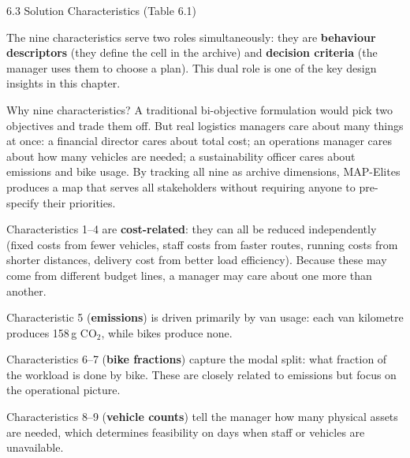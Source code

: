 \documentclass[aspectratio=169,10pt]{beamer}
\begin{document}
\begin{frame}[allowframebreaks]{6.3 Solution Characteristics (Table 6.1)}

The nine characteristics serve two roles simultaneously: they are
\textbf{behaviour descriptors} (they define the cell in the archive)
and \textbf{decision criteria} (the manager uses them to choose a plan).
This dual role is one of the key design insights in this chapter.

\medskip
\begin{block}{Why nine characteristics?}
A traditional bi-objective formulation would pick two objectives and
trade them off.
But real logistics managers care about many things at once:
a financial director cares about total cost; an operations manager
cares about how many vehicles are needed; a sustainability officer
cares about emissions and bike usage.
By tracking all nine as archive dimensions, MAP-Elites produces a map
that serves all stakeholders without requiring anyone to pre-specify
their priorities.
\end{block}

\medskip
Characteristics 1--4 are \textbf{cost-related}: they can all be
reduced independently (fixed costs from fewer vehicles, staff costs
from faster routes, running costs from shorter distances, delivery
cost from better load efficiency).
Because these may come from different budget lines, a manager may care
about one more than another.

Characteristic 5 (\textbf{emissions}) is driven primarily by van
usage: each van kilometre produces 158\,g CO$_2$, while bikes produce
none.

Characteristics 6--7 (\textbf{bike fractions}) capture the modal
split: what fraction of the workload is done by bike.
These are closely related to emissions but focus on the operational
picture.

Characteristics 8--9 (\textbf{vehicle counts}) tell the manager how
many physical assets are needed, which determines feasibility on
days when staff or vehicles are unavailable.

\end{frame}
\end{document}
